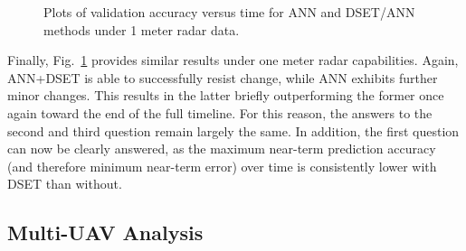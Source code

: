 \documentclass[12pt]{uthesis-v12}  %
\begin{document}
\begin{figure}
	\hfill	
{}
						
\caption{Plots of validation accuracy versus time for ANN and DSET/ANN methods under 1 meter radar data.}
	\label{1-one}
	\end{figure}	
	
Finally, Fig.~\ref{1-one} provides similar results under one meter radar capabilities. Again, ANN+DSET is able to successfully resist change, while ANN exhibits further minor changes. This results in the latter briefly outperforming the former once again toward the end of the full timeline. For this reason, the answers to the second and third question remain largely the same. In addition, the first question can now be clearly answered, as the maximum near-term prediction accuracy (and therefore minimum near-term error) over time is consistently lower with DSET than without.

\subsection{Multi-UAV Analysis}
\label{multi-uav}
\end{document}
